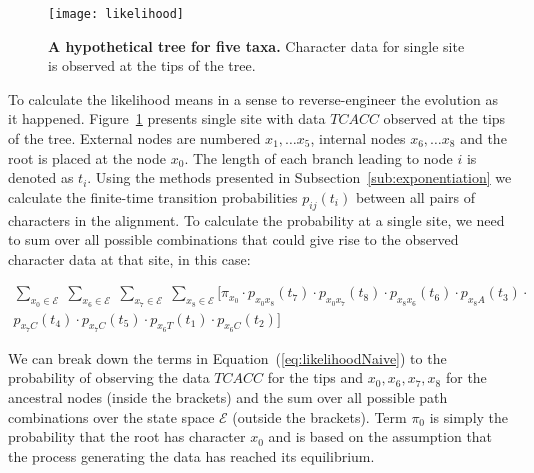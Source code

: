 \begin{figure}[H]
\centering
\texttt{[image: likelihood]} 
\caption{
{ \footnotesize 
{\bf  A hypothetical tree for five taxa.} Character data for single site is observed at the tips of the tree.
} %
}
\label{fig:LIKELIHOOD}
\end{figure}


To calculate the likelihood means in a sense to reverse-engineer the evolution as it happened.
Figure~\ref{fig:LIKELIHOOD} presents single site with data $TCACC$ observed at the tips of the tree.
External nodes are numbered $x_{1}, \ldots x_{5}$, internal nodes $x_{6}, \ldots x_{8}$ and the root is placed at the node $x_{0}$.
The length of each branch leading to node $i$ is denoted as $t_{i}$. %
Using the methods presented in Subsection~\ref{sub:exponentiation} we calculate the finite-time transition probabilities $p_{ij}(t_{i})$ between all pairs of characters in the alignment.
To calculate the probability at a single site, we need to sum over all possible combinations that could give rise to the observed character data at that site, in this case:

\begin{eqnarray}
\underset{x_{0}\in \mathcal{E}}{\sum}\;\underset{x_{6}\in \mathcal{E}}{\sum}\;\underset{x_{7}\in \mathcal{E}}{\sum}\;\underset{x_{8}\in \mathcal{E}}{\sum}[\pi_{x_{0}}\cdot p_{x_{0}x_{8}}(t_{7})\cdot p_{x_{0}x_{7}}(t_{8})\cdot p_{x_{8}x_{6}}(t_{6})\cdot p_{x_{8}A}(t_{3}) \cdot \\ \nonumber
p_{x_{7}C}(t_{4})\cdot p_{x_{7}C}(t_{5})\cdot p_{x_{6}T}(t_{1})\cdot p_{x_{6}C}(t_{2})]
\label{eq:likelihoodNaive}
\end{eqnarray}

We can break down the terms in Equation~(\ref{eq:likelihoodNaive}) %
to the probability of observing the data $TCACC$ for the tips and $x_{0},x_{6},x_{7},x_{8}$ for the ancestral nodes (inside the brackets) and the sum over all possible path combinations over the state space $\mathcal{E}$ (outside the brackets).
Term $\pi_{0}$ is simply the probability that the root has character $x_{0}$ and is based on the assumption that the process generating the data has reached its equilibrium.


